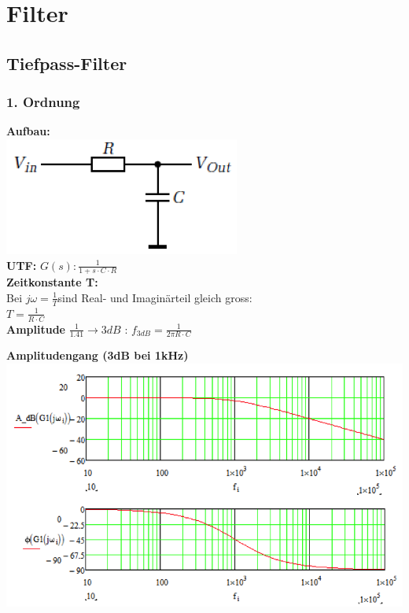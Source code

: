 \section{Filter}
\subsection{Tiefpass-Filter}

\subsubsection{1. Ordnung}
\begin{multicols}{2}
	\textbf{Aufbau:} \\
	\includegraphics[scale=0.4]{pictures/tiefpass1ordnung} \\
	\textbf{UTF: } $G(s): \frac{1}{1+s\cdot C\cdot R}$ \\
	\textbf{Zeitkonstante T:} \\
	Bei $j\omega=\frac{1}{T}$sind Real-  und Imaginärteil gleich gross:  \\
	$T=\frac{1}{R \cdot C}$ \\
	\textbf{Amplitude} $\frac{1}{1.41}\to 3dB$ : $f_{3dB}=\frac{1}{2\pi R\cdot C}$ \\	
\end{multicols}

\textbf{Amplitudengang (3dB bei 1kHz)}\\
\includegraphics[scale=0.5]{pictures/tiefpass1ordnungamplitude}




